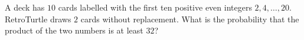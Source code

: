 A deck has $10$ cards labelled with the first ten positive even integers $2,4,\dots,20$. RetroTurtle draws $2$ cards without replacement. What is the probability that the product of the two numbers is at least $32$?
